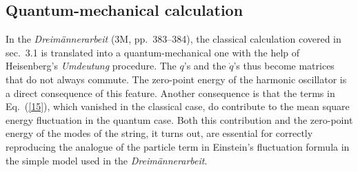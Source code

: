 \documentclass{elsart}
\begin{document}

\subsection{Quantum-mechanical calculation}

In the {\it Dreim\"annerarbeit} (3M, pp.\ 383--384), the classical calculation covered in sec.\ 3.1 is translated into a quantum-mechanical one with the help of Heisenberg's {\it Umdeutung} procedure. The $q$'s and the $\dot{q}$'s thus become matrices that do not always commute. The zero-point energy of the harmonic oscillator is a direct consequence of this feature. Another consequence is that the terms in Eq.\ (\ref{15}), which vanished in the classical case, do contribute to the mean square energy fluctuation in the quantum case. Both this contribution and the zero-point energy of the modes of the string, it turns out, are essential for correctly reproducing the analogue of the particle term in Einstein's fluctuation formula in the simple model used in the {\it Dreim\"annerarbeit}. 
\end{document}
